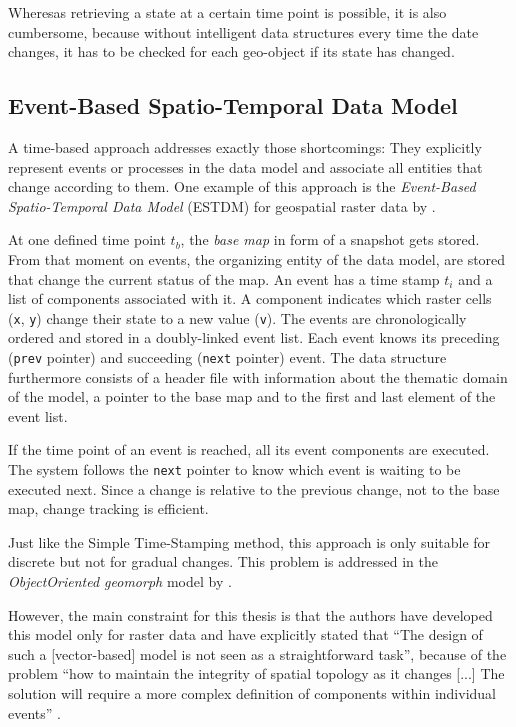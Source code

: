 Wheresas retrieving a state at a certain time point is possible, it is also cumbersome, because without intelligent data structures every time the date changes, it has to be checked for each geo-object if its state has changed.


\subsection{Event-Based Spatio-Temporal Data Model} %
\label{sub:event_based_spatio_temporal_data_model}

A time-based approach addresses exactly those shortcomings: They explicitly represent events or processes in the data model and associate all entities that change according to them. One example of this approach is the \emph{Event-Based Spatio-Temporal Data Model} (ESTDM) for geospatial raster data by
\cite{peuquet95}.

At one defined time point $t_b$, the \emph{base map} in form of a snapshot gets stored. From that moment on events, the organizing entity of the data model, are stored that change the current status of the map. An event has a time stamp $t_i$ and a list of components associated with it. A component indicates which raster cells (\texttt{x}, \texttt{y}) change their state to a new value (\texttt{v}). The events are chronologically ordered and stored in a doubly-linked event list. Each event knows its preceding (\texttt{prev} pointer) and succeeding (\texttt{next} pointer) event. The data structure furthermore consists of a header file with information about the thematic domain of the model, a pointer to the base map and to the first and last element of the event list.


If the time point of an event is reached, all its event components are executed. The system follows the \texttt{next} pointer to know which event is waiting to be executed next. Since a change is relative to the previous change, not to the base map, change tracking is efficient.

Just like the Simple Time-Stamping method, this approach is only suitable for discrete but not for gradual changes. This problem is addressed in the \emph{ObjectOriented geomorph} model by \cite{raperlivingstone95}.

However, the main constraint for this thesis is that the authors have developed this model only for raster data and have explicitly stated that ``The design of such a [vector-based] model is not seen as a straightforward task'', because of the problem ``how to maintain the integrity of spatial topology as it changes [...] The solution will require a more complex definition of components within individual events''
\cite[p. 21]{peuquet95}.

